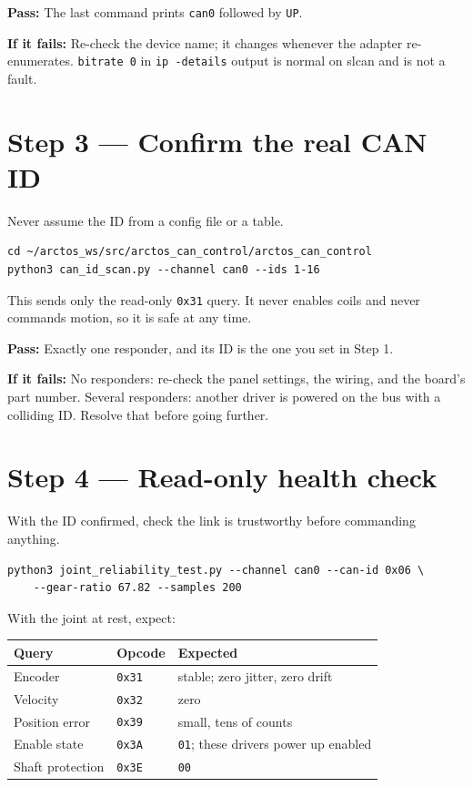 \documentclass[11pt,letterpaper]{article}
\newcommand{\passif}[1]{\par\vspace{2pt}\noindent\textbf{\color{okgreen}Pass:} #1\par\vspace{4pt}}
\newcommand{\failif}[1]{\noindent\textbf{If it fails:} #1\par\vspace{6pt}}
\begin{document}
\passif{The last command prints \texttt{can0} followed by \texttt{UP}.}
\failif{Re-check the device name; it changes whenever the adapter re-enumerates.
\texttt{bitrate 0} in \texttt{ip -details} output is normal on slcan and is not a
fault.}

\section*{Step 3 --- Confirm the real CAN ID}

Never assume the ID from a config file or a table.

\begin{lstlisting}
cd ~/arctos_ws/src/arctos_can_control/arctos_can_control
python3 can_id_scan.py --channel can0 --ids 1-16
\end{lstlisting}

This sends only the read-only \texttt{0x31} query. It never enables coils and never
commands motion, so it is safe at any time.

\passif{Exactly one responder, and its ID is the one you set in Step 1.}
\failif{No responders: re-check the panel settings, the wiring, and the board's part
number. Several responders: another driver is powered on the bus with a colliding
ID. Resolve that before going further.}

\section*{Step 4 --- Read-only health check}

With the ID confirmed, check the link is trustworthy before commanding anything.

\begin{lstlisting}
python3 joint_reliability_test.py --channel can0 --can-id 0x06 \
    --gear-ratio 67.82 --samples 200
\end{lstlisting}

With the joint at rest, expect:

\begin{center}
\begin{tabular}{lll}
\toprule
\textbf{Query} & \textbf{Opcode} & \textbf{Expected} \\ \midrule
Encoder          & \texttt{0x31} & stable; zero jitter, zero drift \\
Velocity         & \texttt{0x32} & zero \\
Position error   & \texttt{0x39} & small, tens of counts \\
Enable state     & \texttt{0x3A} & \texttt{01}; these drivers power up enabled \\
Shaft protection & \texttt{0x3E} & \texttt{00} \\
\bottomrule
\end{tabular}
\end{center}
\end{document}
